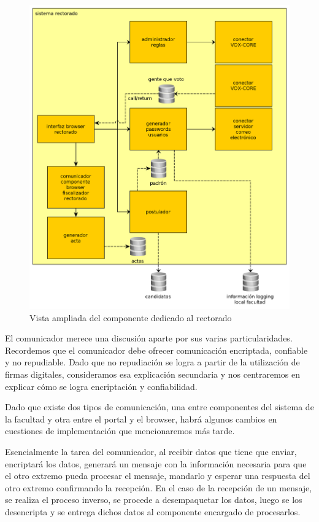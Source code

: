 \begin{figure}[H]
	\begin{center}
		\includegraphics[scale=0.26]{../diagramas/sistemaRectorado.png}
		\caption{Vista ampliada del componente dedicado al rectorado}
	\end{center} 
\end{figure} 

El comunicador merece una discusión aparte por sus varias particularidades. Recordemos que el comunicador debe ofrecer comunicación encriptada, confiable y no repudiable. Dado que no repudiación se logra a partir de la utilización de firmas digitales, consideramos esa explicación secundaria y nos centraremos en explicar cómo se logra encriptación y confiabilidad.

Dado que existe dos tipos de comunicación, una entre componentes del sistema de la facultad y otra entre el portal y el browser, habrá algunos cambios en cuestiones de implementación que mencionaremos más tarde.

Esencialmente la tarea del comunicador, al recibir datos que tiene que enviar, encriptará los datos, generará un mensaje con la información necesaria para que el otro extremo pueda procesar el mensaje, mandarlo y esperar una respuesta del otro extremo confirmando la recepción.
En el caso de la recepción de un mensaje, se realiza el proceso inverso, se procede a desempaquetar los datos, luego se los desencripta y se entrega dichos datos al componente encargado de procesarlos.

